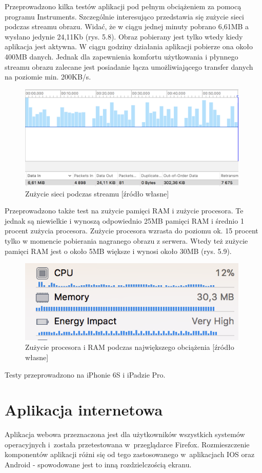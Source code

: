 Przeprowadzono kilka testów aplikacji pod pełnym obciążeniem za pomocą programu Instruments. Szczególnie interesująco przedstawia się zużycie sieci podczas streamu obrazu. Widać, że w ciągu jednej minuty pobrano 6,61MB a wysłano jedynie 24,11Kb (rys. 5.8). Obraz pobierany jest tylko wtedy kiedy aplikacja jest aktywna. W ciągu godziny działania aplikacji pobierze ona około 400MB danych. Jednak dla zapewnienia komfortu użytkowania i płynnego streamu obrazu zalecane jest posiadanie łącza umożliwiającego transfer danych na poziomie min. 200KB/s. 
\begin{figure}[ht]
	\centering
	\includegraphics[width=11cm]{ios_screenshots/networkUsage.png}
	\caption{Zużycie sieci podczas streamu [źródło własne]}
\end{figure}
Przeprowadzono także test na zużycie pamięci RAM i zużycie procesora. Te jednak są niewielkie i wynoszą odpowiednio 25MB pamięci RAM i średnio 1 procent zużycia procesora.
Zużycie procesora wzrasta do poziomu ok. 15 procent tylko w momencie pobierania nagranego obrazu z serwera. Wtedy też zużycie pamięci RAM jest o około 5MB większe i wynosi około 30MB (rys. 5.9).
\begin{figure}[ht]
	\centering
	\includegraphics[width=11cm]{ios_screenshots/CPURAM.png}
	\caption{Zużycie procesora i RAM podczas największego obciążenia [źródło własne]}
\end{figure}
Testy przeprowadzono na iPhonie 6S i iPadzie Pro.


\section{Aplikacja internetowa}
Aplikacja webowa przeznaczona jest dla użytkowników wszystkich systemów operacyjnych i~została przetestowana w~przeglądarce Firefox. Rozmieszczenie komponentów aplikacji różni się od tego zastosowanego w~aplikacjach IOS oraz Android - spowodowane jest to inną rozdzielczością ekranu. 

